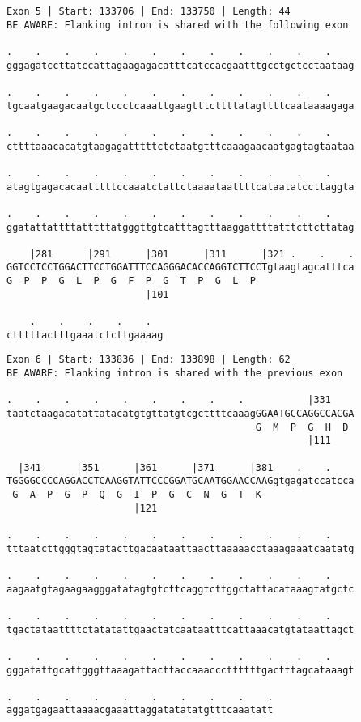 \documentclass{article}
\begin{document}
\begin{Verbatim}[fontfamily=courier]
Exon 5 | Start: 133706 | End: 133750 | Length: 44
BE AWARE: Flanking intron is shared with the following exon

.    .    .    .    .    .    .    .    .    .    .    .    
gggagatccttatccattagaagagacatttcatccacgaatttgcctgctcctaataag

.    .    .    .    .    .    .    .    .    .    .    .    
tgcaatgaagacaatgctccctcaaattgaagtttcttttatagttttcaataaaagaga

.    .    .    .    .    .    .    .    .    .    .    .    
cttttaaacacatgtaagagatttttctctaatgtttcaaagaacaatgagtagtaataa

.    .    .    .    .    .    .    .    .    .    .    .    
atagtgagacacaatttttccaaatctattctaaaataattttcataatatccttaggta

.    .    .    .    .    .    .    .    .    .    .    .    
ggatattattttatttttatgggttgtcatttagtttaaggattttatttcttcttatag

    |281      |291      |301      |311      |321 .    .    .
GGTCCTCCTGGACTTCCTGGATTTCCAGGGACACCAGGTCTTCCTgtaagtagcatttca
G  P  P  G  L  P  G  F  P  G  T  P  G  L  P                 
                        |101                                

    .    .    .    .    .  
ctttttactttgaaatctcttgaaaag
\end{Verbatim}
\newpage
\begin{Verbatim}[fontfamily=courier]
Exon 6 | Start: 133836 | End: 133898 | Length: 62
BE AWARE: Flanking intron is shared with the previous exon

.    .    .    .    .    .    .    .    .           |331    
taatctaagacatattatacatgtgttatgtcgcttttcaaagGGAATGCCAGGCCACGA
                                           G  M  P  G  H  D 
                                                    |111    

  |341      |351      |361      |371      |381    .    .    
TGGGGCCCCAGGACCTCAAGGTATTCCCGGATGCAATGGAACCAAGgtgagatccatcca
 G  A  P  G  P  Q  G  I  P  G  C  N  G  T  K                
                      |121                                  

.    .    .    .    .    .    .    .    .    .    .    .    
tttaatcttgggtagtatacttgacaataattaacttaaaaacctaaagaaatcaatatg

.    .    .    .    .    .    .    .    .    .    .    .    
aagaatgtagaagaagggatatagtgtcttcaggtcttggctattacataaagtatgctc

.    .    .    .    .    .    .    .    .    .    .    .    
tgactataattttctatatattgaactatcaataatttcattaaacatgtataattagct

.    .    .    .    .    .    .    .    .    .    .    .    
gggatattgcattgggttaaagattacttaccaaacccttttttgactttagcataaagt

.    .    .    .    .    .    .    .    .    .
aggatgagaattaaaacgaaattaggatatatatgtttcaaatatt
\end{Verbatim}
\end{document}
